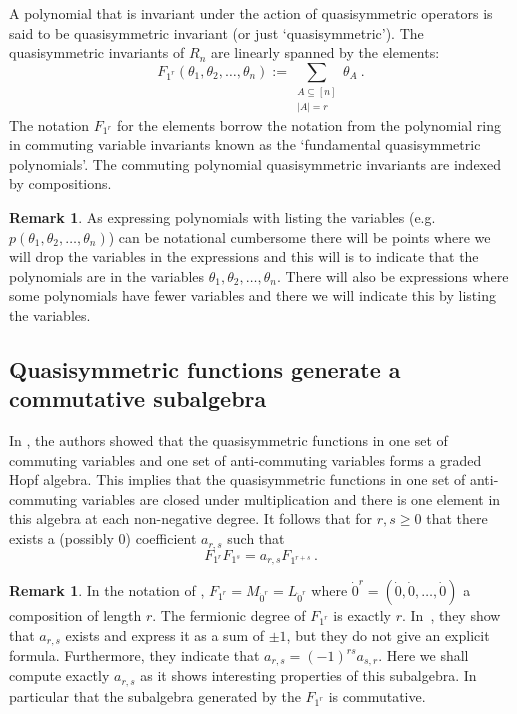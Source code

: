 \documentclass[11pt]{amsart}
\theoremstyle{definition}
\newtheorem{remark}[theorem]{Remark}
\numberwithin{equation}{section}
\begin{document}
A polynomial that is invariant under the action of quasisymmetric operators
is said to be quasisymmetric invariant (or just `quasisymmetric').
The quasisymmetric invariants of $R_n$ are
linearly spanned by the elements:
\begin{equation}\label{eq:defF}
F_{1^r}(\theta_1, \theta_2, \ldots, \theta_n) := \sum_{\substack{A \subseteq [n]\\|A|=r}} \theta_A~.
\end{equation}
The notation $F_{1^r}$ for the elements borrow the notation from the
polynomial ring in commuting variable invariants known as the `fundamental
quasisymmetric polynomials'.  The commuting polynomial quasisymmetric
invariants are indexed by compositions.


\begin{remark}
As expressing polynomials with listing the variables
(e.g. $p(\theta_1, \theta_2, \ldots, \theta_n)$) can be notational cumbersome
there will be points where we will drop the variables in the expressions
and this will is to indicate that the polynomials are in the
variables $\theta_1, \theta_2, \ldots, \theta_n$.  There will also
be expressions where some polynomials have fewer variables and there
we will indicate this by listing the variables.
\end{remark}

\subsection{Quasisymmetric functions generate a commutative subalgebra}
In \cite{FLP}, the authors showed that the quasisymmetric functions in
one set of commuting variables and one set of anti-commuting variables
forms a graded Hopf algebra.  This implies that the quasisymmetric functions
in one set of anti-commuting variables are closed under multiplication
and there is one element in this algebra at each non-negative degree.
It follows that for $r, s \geq0$ that there exists a (possibly $0$)
coefficient $a_{r,s}$ such that
\begin{equation}\label{eq:qsalg}
F_{1^r} F_{1^s} = a_{r,s} F_{1^{r+s}}\,.
\end{equation}

\begin{remark}
In  the notation of \cite{FLP}, $F_{1^r}=M_{\dot{0}^r}=L_{\dot{0}^r}$ where $\dot{0}^r=(\dot{0},\dot{0},\ldots,\dot{0})$ a composition of length $r$.
The fermionic degree of $F_{1^r}$ is exactly $r$.
 In~\cite{FLP}, they show that $a_{r,s}$ exists and express it as a sum of $\pm 1$, but they do not give an explicit formula.
Furthermore, they indicate  that $a_{r,s}=(-1)^{rs}a_{s,r}$. Here we shall compute exactly $a_{r,s}$ as it shows interesting properties of this
subalgebra. In particular that the subalgebra generated by the $F_{1^r}$ is commutative.
\end{remark}
\end{document}
